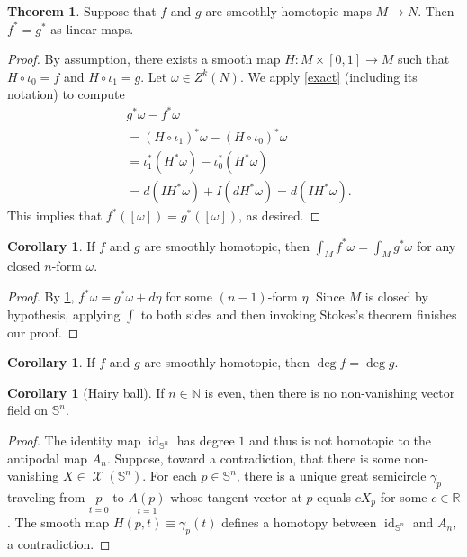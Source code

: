 \documentclass[10pt,letterpaper,cm]{nupset}
\theoremstyle{definition}
\theoremstyle{theorem}
\newtheorem{theorem}[definition]{Theorem}
\newtheorem{corollary}[definition]{Corollary}
\theoremstyle{remark}
\newcommand{\N}{\mathbb N}
\newcommand{\R}{\mathbb R}
\renewcommand{\S}{\mathbb S}
\newcommand{\1}{\mathbf{1}}
\newcommand{\0}{\vec 0}
\DeclareMathOperator{\id}{id}
\DeclareMathOperator{\vf}{\mathscr{X}}
\begin{document}
\begin{theorem}\label{same}
Suppose that $f$ and $g$ are smoothly homotopic maps $ M \to N$. Then $f^{\ast} = g^{\ast}$ as linear maps.
\end{theorem}
\begin{proof}
By assumption, there exists a smooth map $H: M \times \left[0,1\right] \to M$ such that $H \circ \iota_0 =f$ and $H \circ \iota_1 = g$. Let $\omega \in Z^k(N)$. We apply \cref{exact} (including its notation) to compute
\begin{align*}
& g^{\ast} \omega - f^{\ast} \omega 
\\ & = \left(H \circ \iota_1\right)^{\ast} \omega - \left(H \circ \iota_0\right)^{\ast} \omega
\\ & = \iota_1^{\ast} (H^{\ast} \omega) -  \iota_0^{\ast} (H^{\ast} \omega)
\\ & = d(IH^{\ast}\omega)+I(dH^{\ast}\omega) = d(IH^{\ast}\omega).
\end{align*} 
This implies that $f^{\ast}([\omega]) = g^{\ast}([\omega])$, as desired. 
\end{proof}

\begin{corollary}
If  $f$ and $g$ are smoothly homotopic, then $\int_{M}f^{\ast}\omega=\int_{M}g^{\ast}\omega$ for any closed $n$-form $\omega$.
\end{corollary}
\begin{proof}
By \cref{same}, $f^{\ast}{\omega} = g^{\ast}{\omega} + d{\eta}$ for some $\left(n-1\right)$-form $\eta$. Since $M$ is closed by hypothesis, applying $\int$ to both sides and then invoking Stokes's theorem finishes our proof.
\end{proof}

\begin{corollary}
If  $f$ and $g$ are smoothly homotopic, then $\deg f= \deg g$.
\end{corollary}

\begin{corollary}[Hairy ball]\label{hbt}
If $n\in \N$ is even, then there is no non-vanishing vector field on $\S^n$.
\end{corollary}
\begin{proof}
The identity map $\id_{\S^n}$ has degree $1$ and thus is not homotopic to the antipodal map $A_n$. Suppose, toward a contradiction, that there is some non-vanishing $X\in \vf(\S^n)$. For each $p\in \S^n$, there is a unique great semicircle $\gamma_p$ traveling from $\underset{t=0}{p}$ to $\underset{t=1}{A(p)}$ whose tangent vector at $p$ equals $c X_p$ for some $c\in \R$. The smooth map $H(p, t) \equiv \gamma_p(t)$ defines a homotopy between $\id_{\S^n}$  and $A_n$, a contradiction. 
\end{proof}
\end{document}
